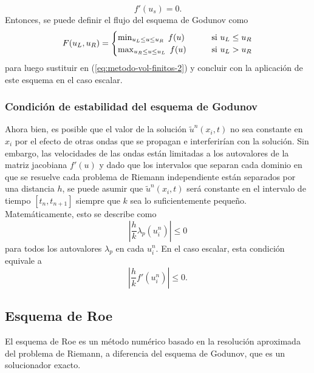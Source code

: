 \begin{equation}
	f'(u_s) = 0.
\end{equation}
Entonces, se puede definir el flujo del esquema de Godunov como
\begin{equation}
	F(u_L,u_R) = 
	\begin{cases}
		\min_{u_L \leq u \leq u_R} \hspace{1mm} f(u) & \hspace{7mm} \text{si }u_L \leq u_R \\
		\max_{u_R \leq u \leq u_L} \hspace{1mm} f(u) & \hspace{7mm} \text{si }u_L > u_R
	\end{cases}
\end{equation}
para luego sustituir en (\ref{eq:metodo-vol-finitos-2}) y concluir con la aplicación de este esquema en el caso escalar.
\subsubsection{Condición de estabilidad del esquema de Godunov}
Ahora bien, es posible que el valor de la solución $\tilde{u}^{n}(x_{i},t)$ no sea constante en $x_i$ por el efecto de otras ondas que se propagan e interferirían con la solución. Sin embargo, las velocidades de las ondas están limitadas a los autovalores de la matriz jacobiana $f'(u)$ y dado que los intervalos que separan cada dominio en que se resuelve cada problema de Riemann independiente están separados por una distancia $h$, se puede asumir que $\tilde{u}^{n}(x_{i},t)$ será constante en el intervalo de tiempo $[t_n, t_{n+1}]$ siempre que $k$ sea lo suficientemente pequeño. Matemáticamente, esto se describe como
\begin{equation}
	\left|\frac{h}{k} \lambda_{p}(u_i^{n})\right| \leq 0
\end{equation}
para todos los autovalores $\lambda_{p}$ en cada $u_i^{n}$. En el caso escalar, esta condición equivale a
\begin{equation}
	\left|\frac{h}{k} f'(u_i^{n})\right| \leq 0.
\end{equation}

\subsection{Esquema de Roe}
El esquema de Roe es un método numérico basado en la resolución aproximada del problema de Riemann, a diferencia del esquema de Godunov, que es un solucionador exacto.

